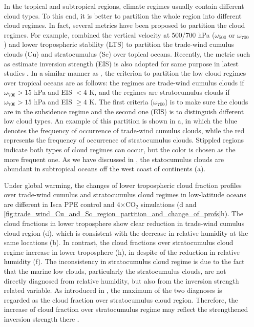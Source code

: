 In the tropical and subtropical regions, climate regimes usually contain different cloud types. To this end, it is better to partition the whole region into different cloud regimes. In fact, several metrics have been proposed to partition the cloud regimes. For example, \cite{Medeiros2011} combined the vertical velocity at 500/700 hPa ($\omega_{500}$ or $\omega_{700}$) and lower tropospheric stability (LTS) to partition the trade-wind cumulus clouds (Cu) and stratocumulus (Sc) over topical oceans. Recently, the metric such as estimate inversion strength (EIS) is also adopted for same purpose in latest studies \citep{Scott2020,Myers2021,Cesana2021}. In a similar manner as \cite{Scott2020}, the criterion to partition the low cloud regimes over tropical oceans are as follows: the regimes are trade-wind cumulus clouds if $\omega_{700}>15$ hPa and EIS $<4$ K, and the regimes are stratocumulus clouds if $\omega_{700}>15$ hPa and EIS $\geq 4$ K. The first criteria ($\omega_{700}$) is to make sure the clouds are in the subsidence regime and the second one (EIS) is to distinguish different low cloud types. An example of this partition is shown in a, in which the blue denotes the frequency of occurrence of trade-wind cumulus clouds, while the red represents the frequency of occurrence of stratocumulus clouds. Stippled regions indicate both types of cloud regimes can occur, but the color is chosen as the more frequent one. As we have discussed in , the statocumulus clouds are abundant in subtropical oceans off the west coast of continents (a). 

Under global warming, the changes of lower tropospheric cloud fraction profiles over trade-wind cumulus and stratocumulus cloud regimes in low-latitude oceans are different in Isca PPE control and 4$\times$CO$_2$ simulations (d and \ref{fig:trade_wind_Cu_and_Sc_region_partition_and_change_of_profs}h). The cloud fractions in lower troposphere show clear reduction in trade-wind cumulus cloud region (d), which is consistent with the decrease in relative humidity at the same locations (b). In contrast, the cloud fractions over stratocumulus cloud regime increase in lower troposphere (h), in despite of the reduction in relative humidity (f). The inconsistency in stratocumulus cloud regime is due to the fact that the marine low clouds, particularly the stratocumulus clouds, are not directly diagnosed from relative humidity, but also from the inversion strength related variable. As introduced in , the maximum of the two diagnoses is regarded as the cloud fraction over stratocumulus cloud region. Therefore, the increase of cloud fraction over stratocumulus regime may reflect the strengthened inversion strength there \citep[e.g.,][]{Webb2013origins,Webb2018interactions}.

